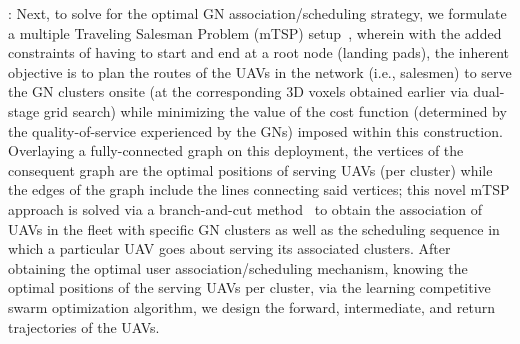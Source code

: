 \documentclass[10pt, twocolumn]{IEEEtran}
\begin{document}
: Next, to solve for the optimal GN association/scheduling strategy, we formulate a multiple Traveling Salesman Problem (mTSP) setup~\cite{mTSP}, wherein with the added constraints of having to start and end at a root node (landing pads), the inherent objective is to plan the routes of the UAVs in the network (i.e., salesmen) to serve the GN clusters onsite (at the corresponding $3$D voxels obtained earlier via dual-stage grid search) while minimizing the value of the cost function (determined by the quality-of-service experienced by the GNs) imposed within this construction. Overlaying a fully-connected graph on this deployment, the vertices of the consequent graph are the optimal positions of serving UAVs (per cluster) while the edges of the graph include the lines connecting said vertices; this novel mTSP approach is solved via a branch-and-cut method~\cite{mTSP} to obtain the association of UAVs in the fleet with specific GN clusters as well as the scheduling sequence in which a particular UAV goes about serving its associated clusters. After obtaining the optimal user association/scheduling mechanism, knowing the optimal positions of the serving UAVs per cluster, via the learning competitive swarm optimization algorithm, we design the forward, intermediate, and return trajectories of the UAVs.\\
\end{document}
